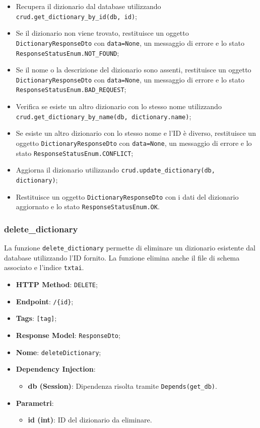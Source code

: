 \begin{itemize}
\item Recupera il dizionario dal database utilizzando \texttt{crud.get\_dictionary\_by\_id(db, id)};
\item Se il dizionario non viene trovato, restituisce un oggetto \texttt{DictionaryResponseDto} con \texttt{data=None}, un messaggio di errore e lo stato \texttt{ResponseStatusEnum.NOT\_FOUND};
\item Se il nome o la descrizione del dizionario sono assenti, restituisce un oggetto \texttt{DictionaryResponseDto} con \texttt{data=None}, un messaggio di errore e lo stato \texttt{Response\-StatusEnum.BAD\_REQUEST};
\item Verifica se esiste un altro dizionario con lo stesso nome utilizzando \texttt{crud.get\-\_\-dictionary\-\_by\_name(db, dictionary.name)};
\item Se esiste un altro dizionario con lo stesso nome e l'ID è diverso, restituisce un oggetto \texttt{DictionaryResponseDto} con \texttt{data=None}, un messaggio di errore e lo stato \texttt{ResponseStatusEnum.CONFLICT};
\item Aggiorna il dizionario utilizzando \texttt{crud.update\_dictionary(db, dictionary)};
\item Restituisce un oggetto \texttt{DictionaryResponseDto} con i dati del dizionario aggiornato e lo stato \texttt{ResponseStatusEnum.OK}.
\end{itemize}

\subsubsection{delete\_dictionary}

\par La funzione \texttt{delete\_dictionary} permette di eliminare un dizionario esistente dal database utilizzando l'ID fornito. La funzione elimina anche il file di schema associato e l'indice \texttt{txtai}.

\begin{itemize}
\item \textbf{HTTP Method}: \texttt{DELETE};
\item \textbf{Endpoint}: \texttt{/\{id\}};
\item \textbf{Tags}: \texttt{[tag]};
\item \textbf{Response Model}: \texttt{ResponseDto};
\item \textbf{Nome}: \texttt{deleteDictionary};
\item \textbf{Dependency Injection}:
\begin{itemize}
\item \textbf{db (Session)}: Dipendenza risolta tramite \texttt{Depends(get\_db)}.
\end{itemize}
\item \textbf{Parametri}:
\begin{itemize}
\item \textbf{id (int)}: ID del dizionario da eliminare.
\end{itemize}
\end{itemize}

